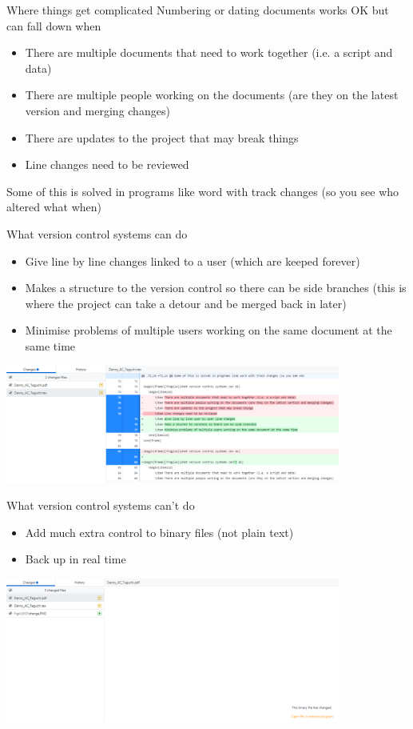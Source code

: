 \documentclass[10pt]{beamer}
\begin{document}
\begin{frame}[fragile]{Where things get complicated}
Numbering or dating documents works OK but can fall down when\\
\begin{itemize}
\item There are multiple documents that need to work together (i.e. a script and data)
\item There are multiple people working on the documents (are they on the latest version and merging changes)
\item There are updates to the project that may break things
\item Line changes need to be reviewed
\end{itemize}

Some of this is solved in programs like word with track changes (so you see who altered what when)
\end{frame}


\begin{frame}[fragile]{What version control systems can do}
\begin{itemize}
\item Give line by line changes linked to a user (which are keeped forever)
\item Makes a structure to the version control so there can be side branches (this is where the project can take a detour and be merged back in later)
\item Minimise problems of multiple users working on the same document at the same time
\end{itemize}
\includegraphics[width=11cm]{Figs/GHD/change}
\end{frame}


\begin{frame}[fragile]{What version control systems can't do}
\begin{itemize}
\item Add much extra control to binary files (not plain text)
\item Back up in real time
\end{itemize}
\includegraphics[width=11cm]{Figs/GHD/binarychange}
\end{frame}
\end{document}
